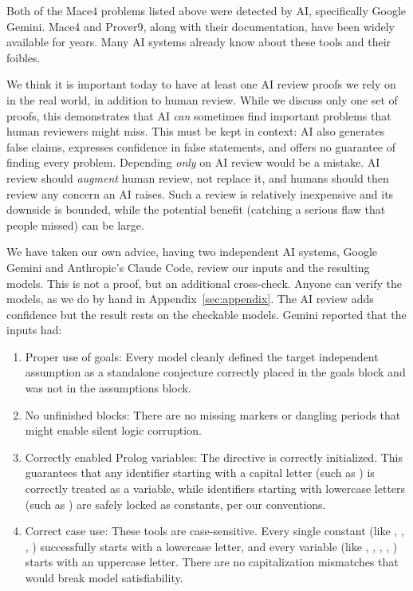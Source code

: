 Both of the Mace4 problems listed above were detected by AI, specifically Google Gemini. Mace4 and Prover9, along with their documentation, have been widely available for years. Many AI systems already know about these tools and their foibles.

We think it is important today to have at least one AI review proofs we rely on in the real world, in addition to human review. While we discuss only one set of proofs, this demonstrates that AI \emph{can} sometimes find important problems that human reviewers might miss. This must be kept in context: AI also generates false claims, expresses confidence in false statements, and offers no guarantee of finding every problem. Depending \emph{only} on AI review would be a mistake. AI review should \emph{augment} human review, not replace it, and humans should then review any concern an AI raises. Such a review is relatively inexpensive and its downside is bounded, while the potential benefit (catching a serious flaw that people missed) can be large.

We have taken our own advice, having two independent AI systems, Google Gemini and Anthropic's Claude Code, review our inputs and the resulting models. This is not a proof, but an additional cross-check. Anyone can verify the models, as we do by hand in Appendix~\ref{sec:appendix}. The AI review adds confidence but the result rests on the checkable models. Gemini reported that the inputs had:

\begin{enumerate}
	\item Proper use of goals: Every model cleanly defined the target independent assumption as a standalone conjecture correctly placed in the goals block and was not in the assumptions block.
	\item No unfinished blocks: There are no missing  markers or dangling periods that might enable silent logic corruption.
	\item Correctly enabled Prolog variables: The directive  is correctly initialized. This guarantees that any identifier starting with a capital letter (such as ) is correctly treated as a variable, while identifiers starting with lowercase letters (such as ) are safely locked as constants, per our conventions.
	\item Correct case use: These tools are case-sensitive. Every single constant (like , , , ) successfully starts with a lowercase letter, and every variable (like , , , , ) starts with an uppercase letter. There are no capitalization mismatches that would break model satisfiability.
\end{enumerate}

